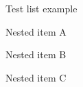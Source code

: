 \begin{testcase}{Test list example}
  \begin{testprocedure}
    \begin{testlist}
      \item Nested item A
      \item Nested item B
      \item Nested item C
    \end{testlist}
  \end{testprocedure}
\end{testcase}
